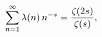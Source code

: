 \[\sum_{n=1}^{\infty}\mathop{\lambda\/}\nolimits\!\left(n\right)n^{-s}=\frac{%
\mathop{\zeta\/}\nolimits\!\left(2s\right)}{\mathop{\zeta\/}\nolimits\!\left(s%
\right)},\]